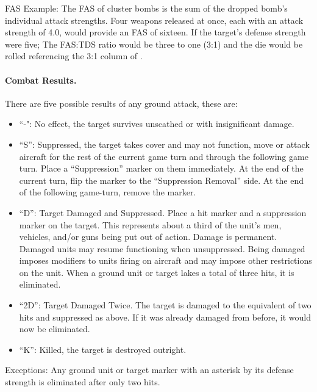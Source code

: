 FAS Example: The FAS of cluster bombs is the sum of the dropped bomb's individual attack strengths. Four weapons released at once, each with an attack strength of 4.0, would provide an FAS of sixteen. If the target's defense strength were five; The FAS:TDS ratio would be three to one (3:1) and the die would be rolled referencing the 3:1 column of .

\paragraph{Combat Results.} There are five possible results of any ground attack, these are:
\begin{itemize}
    \item “-": No effect, the target survives unscathed or with insignificant damage.
    \item “S”: Suppressed, the target takes cover and may not function, move or attack aircraft for the rest of the current game turn and through the following game turn. Place a “Suppression” marker on them immediately. At the end of the current turn, flip the marker to the “Suppression Removal” side. At the end of the following game-turn, remove the marker.
    \item “D”: Target Damaged and Suppressed. Place a hit marker and a suppression marker on the target. This represents about a third of the unit's men, vehicles, and/or guns being put out of action. Damage is permanent. Damaged units may resume functioning when unsuppressed. Being damaged imposes modifiers to units firing on aircraft and may impose other restrictions on the unit. When a ground unit or target lakes a total of three hits, it is eliminated. 
    \item “2D”: Target Damaged Twice. The target is damaged to the equivalent of two hits and suppressed as above. If it was already damaged from before, it would now be eliminated.
    \item “K”: Killed, the target is destroyed outright.
\end{itemize}

Exceptions:  Any ground unit or target marker with an asterisk by its defense strength is eliminated after only two hits.


